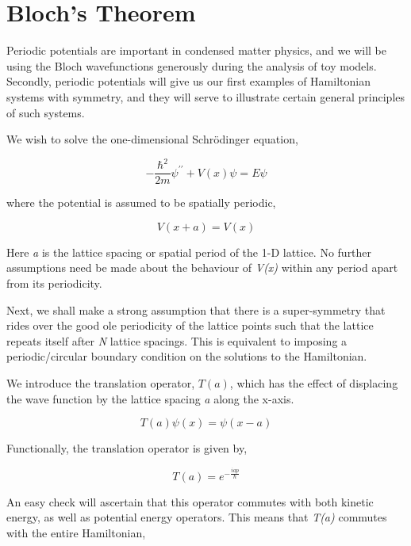 \documentclass{resonance}
\begin{document}
\section{Bloch's Theorem}
Periodic potentials are important in condensed matter physics, and we will be using the Bloch wavefunctions generously during the analysis of toy models. Secondly, periodic potentials will give us our first examples of Hamiltonian systems with symmetry, and they will serve to illustrate certain general principles of such systems. \par
We wish to solve the one-dimensional Schrödinger equation,

\begin{equation}
    -\frac{\hbar^{2}}{2m}\psi^{\prime \prime} + V(x) \psi = E \psi
\end{equation}

where the potential is assumed to be spatially periodic,

\begin{equation}
    V(x+a) = V(x)
\end{equation}

Here \textit{a} is the lattice spacing or spatial period of the 1-D lattice. No further assumptions need be made about the behaviour of \textit{V(x)} within any period apart from its periodicity. \par
Next, we shall make a strong assumption that there is a super-symmetry that rides over the good ole periodicity of the lattice points such that the lattice repeats itself after \textit{N} lattice spacings. This is equivalent to imposing a periodic/circular boundary condition on the solutions to the Hamiltonian. \par
We introduce the translation operator, $T(a)$, which has the effect of displacing the wave function by the lattice spacing \textit{a} along the x-axis. 

\begin{equation}
    T(a) \psi(x) = \psi (x-a)
\end{equation}

Functionally, the translation operator is given by,

\begin{equation}
    T(a) = e^{-\frac{iap}{\hbar}}
\end{equation}

An easy check will ascertain that this operator commutes with both kinetic energy, as well as potential energy operators. This means that \textit{T(a)} commutes with the entire Hamiltonian, 
\end{document}
